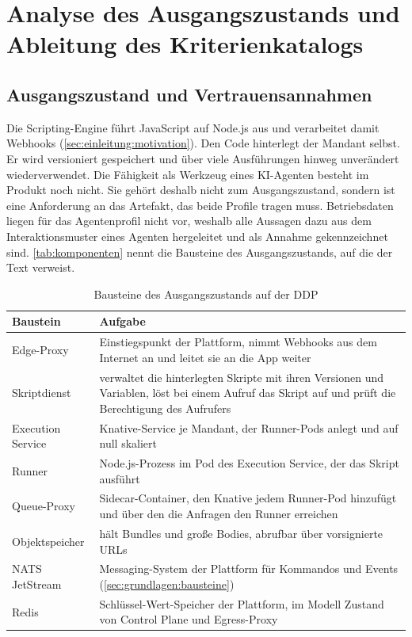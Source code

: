 \clearpage
\section{Analyse des Ausgangszustands und Ableitung des Kriterienkatalogs}
\label{sec:bedrohungsmodell}

\subsection{Ausgangszustand und Vertrauensannahmen}
\label{sec:systemkontext}

Die Scripting-Engine führt JavaScript auf Node.js aus und verarbeitet damit Webhooks
(\autoref{sec:einleitung:motivation}). Den Code hinterlegt der Mandant selbst. Er wird versioniert gespeichert und
über viele Ausführungen hinweg unverändert wiederverwendet. Die Fähigkeit als Werkzeug eines \acs{KI}-Agenten besteht im
Produkt noch nicht. Sie gehört deshalb nicht zum Ausgangszustand, sondern ist eine Anforderung an das Artefakt,
das beide Profile tragen muss. Betriebsdaten liegen für das Agentenprofil nicht vor, weshalb alle Aussagen dazu
aus dem Interaktionsmuster eines Agenten hergeleitet und als Annahme gekennzeichnet sind.
\autoref{tab:komponenten} nennt die Bausteine des Ausgangszustands, auf die der Text verweist.

\begin{table}[H]
  \caption{Bausteine des Ausgangszustands auf der \acs{DDP}}
  \label{tab:komponenten}
  \small
  \begin{tabularx}{\textwidth}{@{}>{\RaggedRight\arraybackslash}p{} >{\RaggedRight\arraybackslash}X@{}}
    \hline
    Baustein & Aufgabe \\
    \hline
    Edge-Proxy & Einstiegspunkt der Plattform, nimmt Webhooks aus dem Internet an und leitet sie an die App weiter \\
    Skriptdienst & verwaltet die hinterlegten Skripte mit ihren Versionen und Variablen, löst bei einem Aufruf das Skript
      auf und prüft die Berechtigung des Aufrufers \\
    Execution Service & Knative-Service je Mandant, der Runner-Pods anlegt und auf null skaliert \\
    Runner & Node.js-Prozess im Pod des Execution Service, der das Skript ausführt \\
    Queue-Proxy & Sidecar-Container, den Knative jedem Runner-Pod hinzufügt und über den die Anfragen den Runner
      erreichen \\
    Objektspeicher & hält Bundles und große Bodies, abrufbar über vorsignierte \acsp{URL} \\
    NATS JetStream & Messaging-System der Plattform für Kommandos und Events (\autoref{sec:grundlagen:bausteine}) \\
    Redis & Schlüssel-Wert-Speicher der Plattform, im Modell Zustand von Control Plane und Egress-Proxy \\
    \hline
  \end{tabularx}
\end{table}

